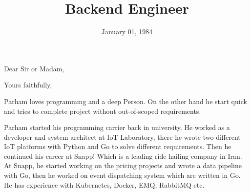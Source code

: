 \documentclass[11pt,a4paper,sans]{moderncv}
\title{Backend Engineer}
\begin{document}
\maketitle

\date{January 01, 1984}
\opening{Dear Sir or Madam,}
\closing{Yours faithfully,}
\makelettertitle

Parham loves programming and a deep Person. On the other hand he start quick and tries to complete project without out-of-scoped requirements.

Parham started his programming carrier back in university.
He worked as a developer and system architect at IoT Laboratory, there he wrote two different IoT platforms with Python and Go to solve different requirements.
Then he continued his career at Snapp! Which is a leading ride hailing company in Iran. At Snapp,
he started working on the pricing projects and wrote a data pipeline with Go, then he worked on event dispatching system which are written in Go.
He has experience with Kubernetes, Docker, EMQ, RabbitMQ etc.

\makeletterclosing
\end{document}
